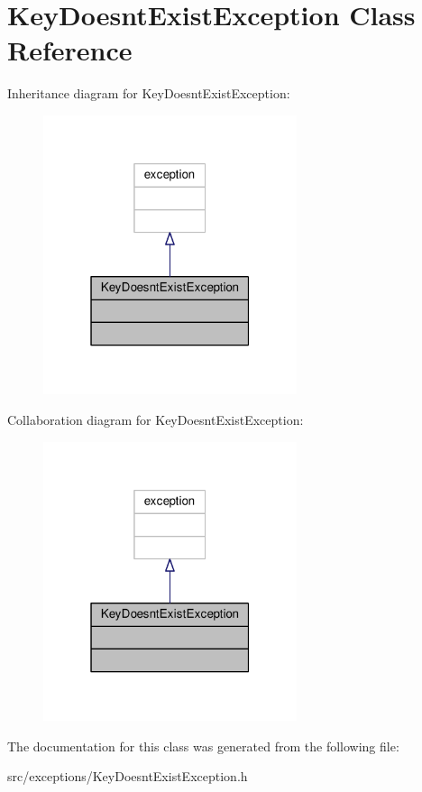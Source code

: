 \hypertarget{classKeyDoesntExistException}{}\section{Key\+Doesnt\+Exist\+Exception Class Reference}
\label{classKeyDoesntExistException}


Inheritance diagram for Key\+Doesnt\+Exist\+Exception\+:\nopagebreak
\begin{figure}[H]
\begin{center}
\leavevmode
\includegraphics[width=211pt]{db/db4/classKeyDoesntExistException__inherit__graph}
\end{center}
\end{figure}


Collaboration diagram for Key\+Doesnt\+Exist\+Exception\+:\nopagebreak
\begin{figure}[H]
\begin{center}
\leavevmode
\includegraphics[width=211pt]{d8/de7/classKeyDoesntExistException__coll__graph}
\end{center}
\end{figure}


The documentation for this class was generated from the following file\+:\begin{DoxyCompactItemize}
\item 
src/exceptions/Key\+Doesnt\+Exist\+Exception.\+h\end{DoxyCompactItemize}
